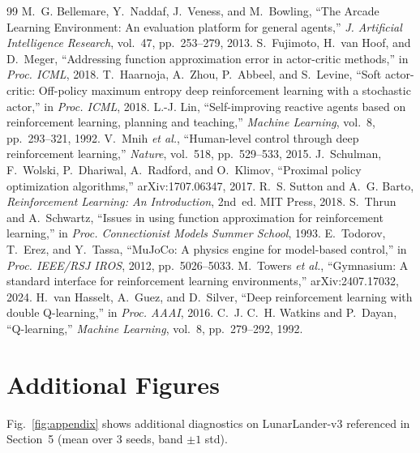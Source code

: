 \documentclass[10pt,twocolumn,letterpaper]{article}
\begin{document}
\small
\begin{thebibliography}{99}\setlength{\itemsep}{0pt}
 M.~G. Bellemare, Y.~Naddaf, J.~Veness, and M.~Bowling, ``The Arcade Learning Environment: An evaluation platform for general agents,'' \emph{J. Artificial Intelligence Research}, vol.~47, pp.~253--279, 2013.
 S.~Fujimoto, H.~van Hoof, and D.~Meger, ``Addressing function approximation error in actor-critic methods,'' in \emph{Proc. ICML}, 2018.
 T.~Haarnoja, A.~Zhou, P.~Abbeel, and S.~Levine, ``Soft actor-critic: Off-policy maximum entropy deep reinforcement learning with a stochastic actor,'' in \emph{Proc. ICML}, 2018.
 L.-J. Lin, ``Self-improving reactive agents based on reinforcement learning, planning and teaching,'' \emph{Machine Learning}, vol.~8, pp.~293--321, 1992.
 V.~Mnih \emph{et al.}, ``Human-level control through deep reinforcement learning,'' \emph{Nature}, vol.~518, pp.~529--533, 2015.
 J.~Schulman, F.~Wolski, P.~Dhariwal, A.~Radford, and O.~Klimov, ``Proximal policy optimization algorithms,'' arXiv:1707.06347, 2017.
 R.~S. Sutton and A.~G. Barto, \emph{Reinforcement Learning: An Introduction}, 2nd~ed. MIT Press, 2018.
 S.~Thrun and A.~Schwartz, ``Issues in using function approximation for reinforcement learning,'' in \emph{Proc. Connectionist Models Summer School}, 1993.
 E.~Todorov, T.~Erez, and Y.~Tassa, ``MuJoCo: A physics engine for model-based control,'' in \emph{Proc. IEEE/RSJ IROS}, 2012, pp.~5026--5033.
 M.~Towers \emph{et al.}, ``Gymnasium: A standard interface for reinforcement learning environments,'' arXiv:2407.17032, 2024.
 H.~van Hasselt, A.~Guez, and D.~Silver, ``Deep reinforcement learning with double Q-learning,'' in \emph{Proc. AAAI}, 2016.
 C.~J. C.~H. Watkins and P.~Dayan, ``Q-learning,'' \emph{Machine Learning}, vol.~8, pp.~279--292, 1992.
\end{thebibliography}
\normalsize

\appendix
\section{Additional Figures}
Fig.~\ref{fig:appendix} shows additional diagnostics on LunarLander-v3 referenced in Section~5 (mean over 3 seeds, band $\pm1$ std).
\end{document}
